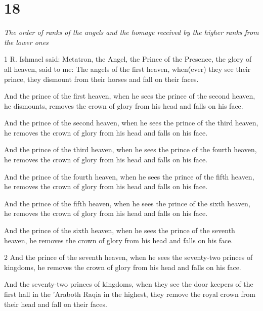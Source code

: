 \chapter{18}

\par \textit{The order of ranks of the angels and the homage received by the higher ranks from the lower ones}

\par 1 R. Ishmael said: Metatron, the Angel, the Prince of the Presence, the glory of all heaven, said to me: The angels of the first heaven, when(ever) they see their prince, they dismount from their horses and fall on their faces. 

\par And the prince of the first heaven, when he sees the prince of the second heaven, he dismounts, removes the crown of glory from his head and falls on his face. 

\par And the prince of the second heaven, when he sees the prince of the third heaven, he removes the crown of glory from his head and falls on his face. 

\par And the prince of the third heaven, when he sees the prince of the fourth heaven, he removes the crown of glory from his head and falls on his face. 

\par And the prince of the fourth heaven, when he sees the prince of the fifth heaven, he removes the crown of glory from his head and falls on his face. 

\par  And the prince of the fifth heaven, when he sees the prince of the sixth heaven, he removes the crown of glory from his head and falls on his face. 

\par And the prince of the sixth heaven, when he sees the prince of the seventh heaven, he removes the crown of glory from his head and falls on his face.

\par 2 And the prince of the seventh heaven, when he sees the seventy-two princes of kingdoms, he removes the crown of glory from his head and falls on his face. 

\par And the seventy-two princes of kingdoms, when they see the door keepers of the first hall in the 'Araboth Raqia in the highest, they remove the royal crown from their head and fall on their faces. 

